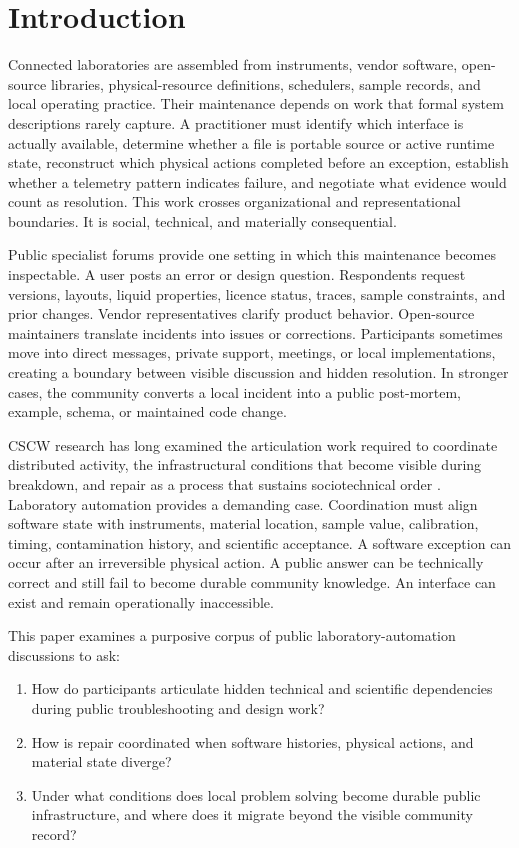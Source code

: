 \section{Introduction}

Connected laboratories are assembled from instruments, vendor software, open-source libraries, physical-resource definitions, schedulers, sample records, and local operating practice. Their maintenance depends on work that formal system descriptions rarely capture. A practitioner must identify which interface is actually available, determine whether a file is portable source or active runtime state, reconstruct which physical actions completed before an exception, establish whether a telemetry pattern indicates failure, and negotiate what evidence would count as resolution. This work crosses organizational and representational boundaries. It is social, technical, and materially consequential.

Public specialist forums provide one setting in which this maintenance becomes inspectable. A user posts an error or design question. Respondents request versions, layouts, liquid properties, licence status, traces, sample constraints, and prior changes. Vendor representatives clarify product behavior. Open-source maintainers translate incidents into issues or corrections. Participants sometimes move into direct messages, private support, meetings, or local implementations, creating a boundary between visible discussion and hidden resolution. In stronger cases, the community converts a local incident into a public post-mortem, example, schema, or maintained code change.

CSCW research has long examined the articulation work required to coordinate distributed activity, the infrastructural conditions that become visible during breakdown, and repair as a process that sustains sociotechnical order \cite{schmidt1992articulation,star1996infrastructure,jackson2014repair}. Laboratory automation provides a demanding case. Coordination must align software state with instruments, material location, sample value, calibration, timing, contamination history, and scientific acceptance. A software exception can occur after an irreversible physical action. A public answer can be technically correct and still fail to become durable community knowledge. An interface can exist and remain operationally inaccessible.

This paper examines a purposive corpus of public laboratory-automation discussions to ask:
\begin{enumerate}
  \item How do participants articulate hidden technical and scientific dependencies during public troubleshooting and design work?
  \item How is repair coordinated when software histories, physical actions, and material state diverge?
  \item Under what conditions does local problem solving become durable public infrastructure, and where does it migrate beyond the visible community record?
\end{enumerate}

